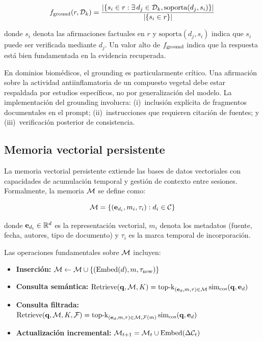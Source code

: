 \begin{equation}
\label{eq:grounding}
  f_{\text{ground}}(r, \mathcal{D}_k) = \frac{|\{s_i \in r : \exists\, d_j \in \mathcal{D}_k, \text{soporta}(d_j, s_i)\}|}{|\{s_i \in r\}|}
\end{equation}

\noindent donde $s_i$ denota las afirmaciones factuales en $r$ y $\text{soporta}(d_j, s_i)$ indica que $s_i$ puede ser verificada mediante $d_j$. Un valor alto de $f_{\text{ground}}$ indica que la respuesta está bien fundamentada en la evidencia recuperada.

En dominios biomédicos, el grounding es particularmente crítico. Una afirmación sobre la actividad antiinflamatoria de un compuesto vegetal debe estar respaldada por estudios específicos, no por generalización del modelo. La implementación del grounding involucra: (i)~inclusión explícita de fragmentos documentales en el prompt; (ii)~instrucciones que requieren citación de fuentes; y (iii)~verificación posterior de consistencia.

\subsection{Memoria vectorial persistente}
\label{subsec:tf_memory}

La memoria vectorial persistente extiende las bases de datos vectoriales con capacidades de acumulación temporal y gestión de contexto entre sesiones. Formalmente, la memoria $\mathcal{M}$ se define como:

\begin{equation}
\label{eq:memory}
  \mathcal{M} = \{(\mathbf{e}_{d_i}, m_i, \tau_i) : d_i \in \mathcal{C}\}
\end{equation}

\noindent donde $\mathbf{e}_{d_i} \in \mathbb{R}^d$ es la representación vectorial, $m_i$ denota los metadatos (fuente, fecha, autores, tipo de documento) y $\tau_i$ es la marca temporal de incorporación.

Las operaciones fundamentales sobre $\mathcal{M}$ incluyen:
\begin{itemize}[leftmargin=*]
  \item \textbf{Inserción:} $\mathcal{M} \leftarrow \mathcal{M} \cup \{(\operatorname{Embed}(d), m, \tau_{\text{now}})\}$
  \item \textbf{Consulta semántica:} $\operatorname{Retrieve}(\mathbf{q}, \mathcal{M}, K) = \operatorname{top\text{-}k}_{(\mathbf{e}_{d}, m, \tau) \in \mathcal{M}} \operatorname{sim_{cos}}(\mathbf{q}, \mathbf{e}_{d})$
  \item \textbf{Consulta filtrada:} $\operatorname{Retrieve}(\mathbf{q}, \mathcal{M}, K, \mathcal{F}) = \operatorname{top\text{-}k}_{(\mathbf{e}_{d}, m, \tau) \in \mathcal{M}, \mathcal{F}(m)} \operatorname{sim_{cos}}(\mathbf{q}, \mathbf{e}_{d})$
  \item \textbf{Actualización incremental:} $\mathcal{M}_{t+1} = \mathcal{M}_t \cup \operatorname{Embed}(\Delta\mathcal{C}_t)$
\end{itemize}

